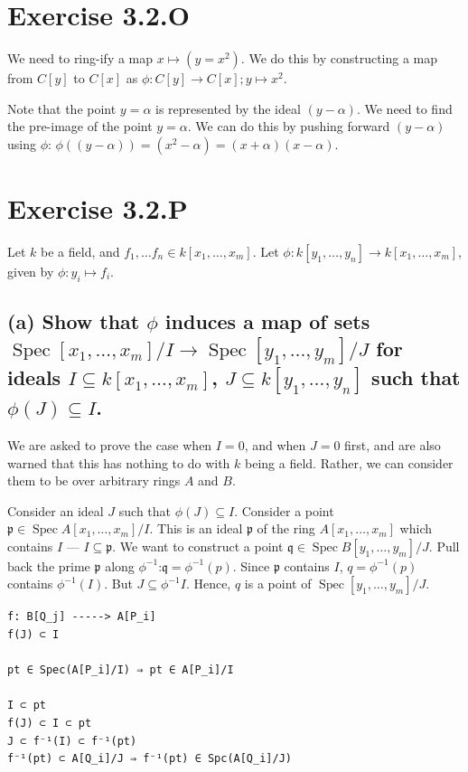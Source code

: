 \documentclass{book}
\newcommand{\Spec}{\operatorname{Spec}}
\newcommand{\p}{\mathfrak{p}}
\newcommand{\q}{\mathfrak{q}}
\theoremstyle{definition}
\begin{document}
\section{Exercise 3.2.O}


We need to ring-ify a map $x \mapsto (y = x^2)$. We do this by constructing
a map from $C[y]$ to $C[x]$ as $\phi: C[y] \rightarrow C[x]; y \mapsto x^2$.

Note that the point $y = \alpha$ is represented by the ideal $(y - \alpha)$. We
need to find the pre-image of the point $y = \alpha$. We can do this
by pushing forward $(y - \alpha)$ using $\phi$: $\phi((y - \alpha)) = (x^2 - \alpha) = (x + \alpha) (x - \alpha)$.

\section{Exercise 3.2.P} 
Let $k$ be a field, and $f_1, \dots f_n \in k[x_1, \dots, x_m]$.
Let $\phi: k[y_1, \dots, y_n] \rightarrow k[x_1, \dots, x_m]$, given
by $\phi: y_i \mapsto f_i$. 

\subsection{(a) Show that $\phi$ induces a map of sets $\Spec[x_1, \dots, x_m]/I \rightarrow \Spec[y_1, \dots, y_m]/J$
for ideals $I \subseteq k[x_1, \dots, x_m]$, $J \subseteq k[y_1, \dots, y_n]$ such that $\phi(J) \subseteq I$.}
We are asked to prove the case when $I = 0$, and when $J = 0$ first, and are also warned
that this has nothing to do with $k$ being a field. Rather, we can consider
them to be over arbitrary rings $A$ and $B$.

Consider an ideal $J$ such that $\phi(J) \subseteq I$. Consider
a point  $\p \in \Spec A[x_1, \dots, x_m]/I$. This is an ideal $\p$ of the
ring $A[x_1, \dots, x_m]$ which contains $I$ --- $I \subseteq \p$. We want
to construct a point $\q \in \Spec B[y_1, \dots, y_m]/J$. Pull back the
prime $\p$ along $\phi^{-1}$:$ \q = \phi^{-1}(p)$. Since $\p$ contains $I$,
$q = \phi^{-1}(p)$ contains $\phi^{-1}(I)$. But $J \subseteq \phi^{-1} I$. Hence,
$q$ is a point of $\Spec[y_1, \dots, y_m]/J$.



\begin{verbatim}
f: B[Q_j] -----> A[P_i]
f(J) ⊂ I

pt ∈ Spec(A[P_i]/I) ⇒ pt ∈ A[P_i]/I

I ⊂ pt
f(J) ⊂ I ⊂ pt
J ⊂ f⁻¹(I) ⊂ f⁻¹(pt)
f⁻¹(pt) ⊂ A[Q_i]/J ⇒ f⁻¹(pt) ∈ Spc(A[Q_i]/J)
\end{verbatim}
\end{document}
